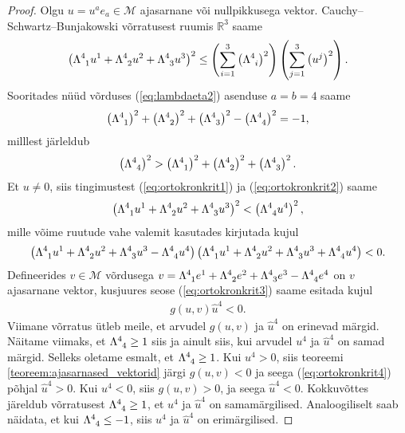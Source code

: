 \documentclass[12pt,a4paper,oneside]{article}
\theoremstyle{plain}
\theoremstyle{definition}
\numberwithin{equation}{section}
\def\R{{\mathbb R}}
\def\M{{\mathcal M}}
\begin{document}
\begin{proof}
Olgu $u = u^a e_a \in \M$ ajasarnane või nullpikkusega vektor. 
Cauchy--Schwartz--Bunjakowski võrratusest ruumis $\R^{3}$ saame
\begin{align} \label{eq:ortokronkrit1}
\left(\Lambda\indices{^4_1} u^1 + \Lambda\indices{^4_2} u^2 + 
\Lambda\indices{^4_3} u^3\right)^2 \leq \left(\sum_{i = 1}^{3} 
\left(\Lambda\indices{^4_i}\right)^2 \right) \left(\sum_{j = 1}^{3} 
\left(u^j\right)^2 \right).
\end{align}
Sooritades nüüd võrduses (\ref{eq:lambdaeta2}) asenduse $a = b = 4$ 
saame
\[\left(\Lambda\indices{^4_1}\right)^2 + 
	\left(\Lambda\indices{^4_2}\right)^2 + 
	\left(\Lambda\indices{^4_3}\right)^2 - 
	\left(\Lambda\indices{^4_4}\right)^2 = -1,\]
milllest järleldub
\begin{align} \label{eq:ortokronkrit2}
\left(\Lambda\indices{^4_4}\right)^2 > 
	\left(\Lambda\indices{^4_1}\right)^2 + 
	\left(\Lambda\indices{^4_2}\right)^2 + 
	\left(\Lambda\indices{^4_3}\right)^2.
\end{align}
Et $u \neq 0$, siis tingimustest (\ref{eq:ortokronkrit1}) ja 
(\ref{eq:ortokronkrit2}) saame 
\[\left(\Lambda\indices{^4_1} u^1 
+ \Lambda\indices{^4_2} u^2 + \Lambda\indices{^4_3} u^3\right)^2 < 
\left(\Lambda\indices{^4_4} u^4\right)^2,\] 
mille võime ruutude vahe valemit kasutades kirjutada kujul
\begin{align} \label{eq:ortokronkrit3}
\left(\Lambda\indices{^4_1} u^1 + \Lambda\indices{^4_2} u^2 + 
\Lambda\indices{^4_3} u^3 - \Lambda\indices{^4_4} u^4\right)
\left(\Lambda\indices{^4_1} u^1 + \Lambda\indices{^4_2} u^2 + 
\Lambda\indices{^4_3} u^3 + \Lambda\indices{^4_4} u^4\right) < 0.
\end{align}
Defineerides $v \in \M$ võrdusega $v = \Lambda\indices{^4_1} e^1 + 
\Lambda\indices{^4_2} e^2 + \Lambda\indices{^4_3} e^3 - 
\Lambda\indices{^4_4} e^4$ on $v$ ajasarnane vektor, kusjuures seose 
(\ref{eq:ortokronkrit3}) saame esitada kujul
\begin{align} \label{eq:ortokronkrit4}
g\left(u , v\right)\hat{u}^4 < 0.
\end{align}
Viimane võrratus ütleb meile, et arvudel $g\left(u,v\right)$ ja 
$\hat{u}^4$ on erinevad märgid.
Näitame viimaks, et $\Lambda\indices{^4_4} \geq 1$ siis ja ainult 
siis, kui arvudel $u^4$ ja $\hat{u}^4$ on samad märgid.
Selleks oletame esmalt, et $\Lambda\indices{^4_4} \geq 1$. Kui 
$u^4 > 0$, siis teoreemi \ref{teoreem:ajasarnased_vektorid} järgi 
$g\left(u, v\right) < 0$ ja seega (\ref{eq:ortokronkrit4}) põhjal 
$\hat{u}^4 >0$. Kui $u^4 < 0$, siis $g\left(u, v\right) > 0$, ja 
seega $\hat{u}^4 < 0$. Kokkuvõttes järeldub võrratusest 
$\Lambda\indices{^4_4} \geq 1$, et $u^4$ ja $\hat{u}^4$ on 
samamärgilised. Analoogiliselt saab näidata, et kui 
$\Lambda\indices{^4_4} \leq -1$, siis $u^4$ ja $\hat{u}^4$ on 
erimärgilised.
\end{proof}
\end{document}
